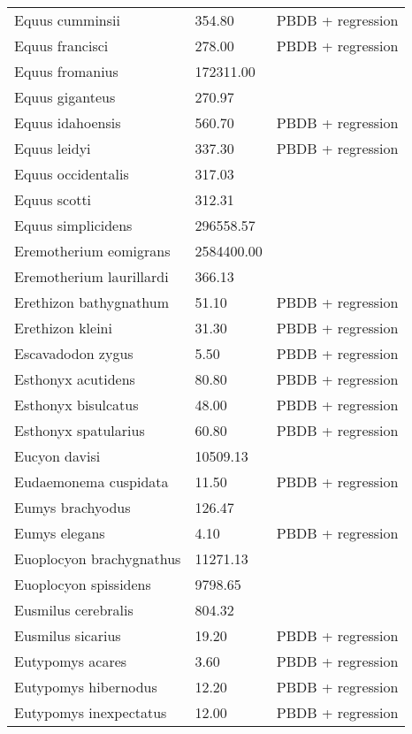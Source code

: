 \documentclass{article}
\begin{document}
\begin{center}
\begin{longtable}{p{} p{} p{}}
    Equus cumminsii & 354.80 & PBDB + regression \\ 
    Equus francisci & 278.00 & PBDB + regression \\ 
    Equus fromanius & 172311.00 & \cite{McKenna2011} \\ 
    Equus giganteus & 270.97 & \cite{Smith2004} \\ 
    Equus idahoensis & 560.70 & PBDB + regression \\ 
    Equus leidyi & 337.30 & PBDB + regression \\ 
    Equus occidentalis & 317.03 & \cite{Smith2004} \\ 
    Equus scotti & 312.31 & \cite{Smith2004} \\ 
    Equus simplicidens & 296558.57 & \cite{Tomiya2013} \\ 
    Eremotherium eomigrans & 2584400.00 & \cite{McDonald2005} \\ 
    Eremotherium laurillardi & 366.13 & \cite{Smith2004} \\ 
    Erethizon bathygnathum & 51.10 & PBDB + regression \\ 
    Erethizon kleini & 31.30 & PBDB + regression \\ 
    Escavadodon zygus & 5.50 & PBDB + regression \\ 
    Esthonyx acutidens & 80.80 & PBDB + regression \\ 
    Esthonyx bisulcatus & 48.00 & PBDB + regression \\ 
    Esthonyx spatularius & 60.80 & PBDB + regression \\ 
    Eucyon davisi & 10509.13 & \cite{Tomiya2013} \\ 
    Eudaemonema cuspidata & 11.50 & PBDB + regression \\ 
    Eumys brachyodus & 126.47 & \cite{Tomiya2013} \\ 
    Eumys elegans & 4.10 & PBDB + regression \\ 
    Euoplocyon brachygnathus & 11271.13 & \cite{Tomiya2013} \\ 
    Euoplocyon spissidens & 9798.65 & \cite{Tomiya2013} \\ 
    Eusmilus cerebralis & 804.32 & \cite{Tomiya2013} \\ 
    Eusmilus sicarius & 19.20 & PBDB + regression \\ 
    Eutypomys acares & 3.60 & PBDB + regression \\ 
    Eutypomys hibernodus & 12.20 & PBDB + regression \\ 
    Eutypomys inexpectatus & 12.00 & PBDB + regression \\ 

\end{longtable}
\end{center}
\end{document}
